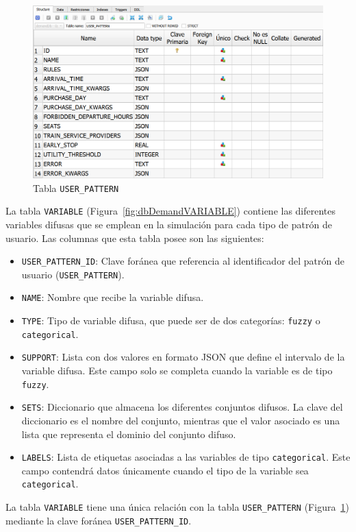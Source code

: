 \begin{figure}[H]
\centering
\includegraphics[width=.9\textwidth]{fig/Tablas base de datos/Demanda/USER_PATTERN.png}
\caption{Tabla \texttt{USER\_PATTERN}}
\label{fig:dbDemandUSER_PATTERN}
\end{figure}

La tabla \texttt{VARIABLE} (Figura~\ref{fig:dbDemandVARIABLE}) contiene las diferentes variables difusas que se emplean en la simulación para cada tipo de patrón de usuario. Las columnas que esta tabla posee son las siguientes:
\begin{itemize}
    \item \texttt{USER\_PATTERN\_ID}: Clave foránea que referencia al identificador del patrón de usuario (\texttt{USER\_PATTERN}).
    \item \texttt{NAME}: Nombre que recibe la variable difusa.
    \item \texttt{TYPE}: Tipo de variable difusa, que puede ser de dos categorías: \texttt{fuzzy} o \texttt{categorical}.
    \item \texttt{SUPPORT}: Lista con dos valores en formato \acrshort{JSON} que define el intervalo de la variable difusa. Este campo solo se completa cuando la variable es de tipo \texttt{fuzzy}.
    \item \texttt{SETS}: Diccionario que almacena los diferentes conjuntos difusos. La clave del diccionario es el nombre del conjunto, mientras que el valor asociado es una lista que representa el dominio del conjunto difuso.
    \item \texttt{LABELS}: Lista de etiquetas asociadas a las variables de tipo \texttt{categorical}. Este campo contendrá datos únicamente cuando el tipo de la variable sea \texttt{categorical}.
\end{itemize}

La tabla \texttt{VARIABLE} tiene una única relación con la tabla \texttt{USER\_PATTERN} (Figura~\ref{fig:dbDemandUSER_PATTERN}) mediante la clave foránea \texttt{USER\_PATTERN\_ID}.

